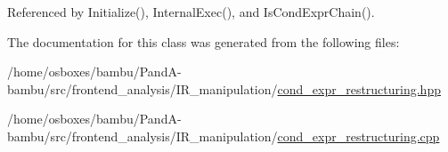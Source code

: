 Referenced by Initialize(), Internal\+Exec(), and Is\+Cond\+Expr\+Chain().



The documentation for this class was generated from the following files\+:\begin{DoxyCompactItemize}
\item 
/home/osboxes/bambu/\+Pand\+A-\/bambu/src/frontend\+\_\+analysis/\+I\+R\+\_\+manipulation/\hyperlink{cond__expr__restructuring_8hpp}{cond\+\_\+expr\+\_\+restructuring.\+hpp}\item 
/home/osboxes/bambu/\+Pand\+A-\/bambu/src/frontend\+\_\+analysis/\+I\+R\+\_\+manipulation/\hyperlink{cond__expr__restructuring_8cpp}{cond\+\_\+expr\+\_\+restructuring.\+cpp}\end{DoxyCompactItemize}
